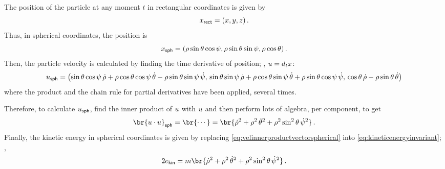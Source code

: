 \begin{solution}
  The position of the particle at any moment $t$ in rectangular coordinates is given by
  \begin{equation}\label{eq:positionvectorrectangular}
    \pos\sbtxt{rect} = \tuple{\xpos,\ypos,\zpos}\,.
  \end{equation}
  Thus, in spherical coordinates, the position is
  \begin{equation}\label{eq:positionvectorspherical}
    \pos\sbtxt{sph} = \tuple{\sxpos\sin\sypos\cos\szpos, \sxpos\sin\sypos\sin\szpos, \sxpos\cos\sypos}\,.
  \end{equation}
  Then, the particle velocity is calculated by finding the time derivative of position; \ie, $u = d_tx$:
  \begin{equation}\label{eq:velocityvectorrspherical}
    \vel\sbtxt{sph} = \tuple{
                        \sin\sypos\cos\szpos\,\dt\sxpos + \sxpos\cos\sypos\cos\szpos\,\dt\sypos - \sxpos\sin\sypos\sin\szpos\,\dt\szpos,\,
                        \sin\sypos\sin\szpos\,\dt\sxpos + \sxpos\cos\sypos\sin\szpos\,\dt\sypos + \sxpos\sin\sypos\cos\szpos\,\dt\szpos,\,
                        \cos\sypos\,\dt\sxpos - \sxpos\sin\sypos\,\dt\sypos
                            }
  \end{equation}
  where the product and the chain rule for partial derivatives have been applied, several times.
  
  Therefore, to calculate $u_\text{\textsf{sph}}$, find the inner product of $u$ with $u$ and then perform lots of algebra, per component, to get
  \begin{equation}\label{eq:velinnerproductvectorspherical}
    \br{\vel\iprod\vel}\sbtxt{sph} = \br{\cdots}
                                   = \br{\dt\sxpos^2 + \sxpos^2\,\dt\sypos^2 + \sxpos^2\sin^2\sypos\,\dt\szpos^2}\,.
  \end{equation}
  Finally, the kinetic energy in spherical coordinates is given by replacing \cref{eq:velinnerproductvectorspherical} into \cref{eq:kineticenergyinvariant}; \ie,
  \begin{equation}\label{eq:kinenergyvectorspherical}
    2\ekin = \mass\br{\dt\sxpos^2 + \sxpos^2\,\dt\sypos^2 + \sxpos^2\sin^2\sypos\,\dt\szpos^2}\,.
  \end{equation}
\end{solution}

